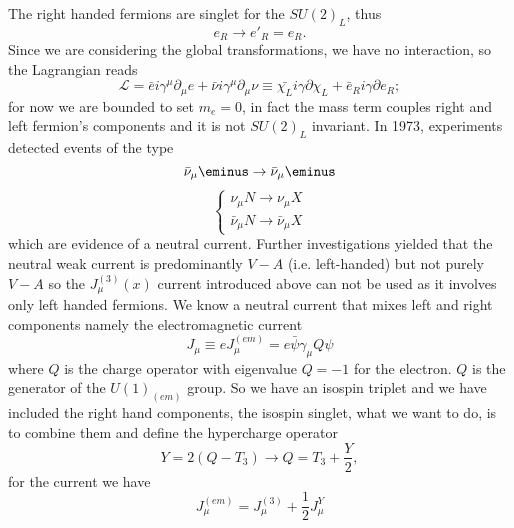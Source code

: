The right handed fermions are singlet for the $SU(2)_{L}$, thus
\begin{equation}
  e_{R} \to e'_{R}= e_{R}.
\end{equation}
Since we are considering the global transformations, we have no interaction, so
the Lagrangian reads
\begin{equation}
  \label{eq:2}
  \mathcal{L} = \bar{e} i \gamma^{\mu} \partial_{\mu} e + \bar{\nu} i
  \gamma^{\mu} \partial_{\mu} \nu \equiv \bar{\chi_{L}} i
  \gamma \partial \chi_{L} + \bar{e}_{R} i \gamma \partial e_{R};
\end{equation}
for now we are bounded to set $m_{e} = 0$, in fact the mass term couples right
and left fermion's components and it is not $SU(2)_{L}$ invariant.  In 1973,
experiments detected events of the type
\begin{equation}
  \label{eq:3}
  \bar{\nu}_{\mu}\eminus \rightarrow \bar{\nu}_{\mu}\eminus \\
\end{equation}
\begin{equation}
  \label{eq:4}
  \begin{cases}
    \nu_{\mu} N \rightarrow \nu_{\mu} X \\
    \bar{\nu}_{\mu} N \rightarrow \bar{\nu}_{\mu} X
  \end{cases}
\end{equation}
which are evidence of a neutral current. Further investigations yielded that the
neutral weak current is predominantly $V-A$ (i.e. left-handed) but not purely
$V-A$ so the $J^{(3)}_{\mu}(x)$ current introduced above can not be used as it
involves only left handed fermions.  We know a neutral current that mixes left
and right components namely the electromagnetic current
\begin{equation}
  \label{eq:5}
  J_{\mu} \equiv e J_{\mu}^{(em)} = e \bar{\psi} \gamma_{\mu} Q \psi
\end{equation}
where $Q$ is the charge operator with eigenvalue $Q = -1$ for the electron. $Q$
is the generator of the $U(1)_{(em)}$ group. So we have an isospin triplet and
we have included the right hand components, the isospin singlet, what we want to
do, is to combine them and define the hypercharge operator
\begin{equation}
  \label{eq:6}
  Y = 2 ( Q - T_{3}) \rightarrow Q = T_{3} + \frac{Y}{2},
\end{equation}
for the current we have
\begin{equation}
  \label{eq:7}
  J_{\mu}^{(em)} = J_{\mu}^{(3)} + \frac{1}{2} J_{\mu}^{Y}
\end{equation}
